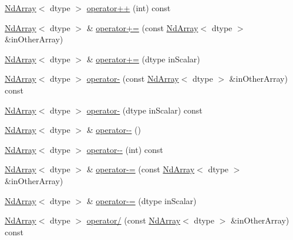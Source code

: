 \begin{DoxyCompactItemize}
\item 
\mbox{\hyperlink{class_num_cpp_1_1_nd_array}{Nd\+Array}}$<$ dtype $>$ \mbox{\hyperlink{class_num_cpp_1_1_nd_array_a3b71c8d4b1f8bf6403a270df980ae7c9}{operator++}} (int) const
\item 
\mbox{\hyperlink{class_num_cpp_1_1_nd_array}{Nd\+Array}}$<$ dtype $>$ \& \mbox{\hyperlink{class_num_cpp_1_1_nd_array_ade15ba24ad3bc5474c5f53681a6fd3fe}{operator+=}} (const \mbox{\hyperlink{class_num_cpp_1_1_nd_array}{Nd\+Array}}$<$ dtype $>$ \&in\+Other\+Array)
\item 
\mbox{\hyperlink{class_num_cpp_1_1_nd_array}{Nd\+Array}}$<$ dtype $>$ \& \mbox{\hyperlink{class_num_cpp_1_1_nd_array_a8a20ee8121408997c375ca1abb84273a}{operator+=}} (dtype in\+Scalar)
\item 
\mbox{\hyperlink{class_num_cpp_1_1_nd_array}{Nd\+Array}}$<$ dtype $>$ \mbox{\hyperlink{class_num_cpp_1_1_nd_array_abae124e6544458fec2b28685b59d7e3a}{operator-\/}} (const \mbox{\hyperlink{class_num_cpp_1_1_nd_array}{Nd\+Array}}$<$ dtype $>$ \&in\+Other\+Array) const
\item 
\mbox{\hyperlink{class_num_cpp_1_1_nd_array}{Nd\+Array}}$<$ dtype $>$ \mbox{\hyperlink{class_num_cpp_1_1_nd_array_a1b0d4f050529450d7232abd459168341}{operator-\/}} (dtype in\+Scalar) const
\item 
\mbox{\hyperlink{class_num_cpp_1_1_nd_array}{Nd\+Array}}$<$ dtype $>$ \& \mbox{\hyperlink{class_num_cpp_1_1_nd_array_a79070064dbee1bc428c0863b02be69b1}{operator-\/-\/}} ()
\item 
\mbox{\hyperlink{class_num_cpp_1_1_nd_array}{Nd\+Array}}$<$ dtype $>$ \mbox{\hyperlink{class_num_cpp_1_1_nd_array_afe9c56f2d5ff4d221d7842ef740b70e7}{operator-\/-\/}} (int) const
\item 
\mbox{\hyperlink{class_num_cpp_1_1_nd_array}{Nd\+Array}}$<$ dtype $>$ \& \mbox{\hyperlink{class_num_cpp_1_1_nd_array_aff0145b9754a80df6934caff08131e39}{operator-\/=}} (const \mbox{\hyperlink{class_num_cpp_1_1_nd_array}{Nd\+Array}}$<$ dtype $>$ \&in\+Other\+Array)
\item 
\mbox{\hyperlink{class_num_cpp_1_1_nd_array}{Nd\+Array}}$<$ dtype $>$ \& \mbox{\hyperlink{class_num_cpp_1_1_nd_array_a0623a6cffd97c49df7d34d5de335143b}{operator-\/=}} (dtype in\+Scalar)
\item 
\mbox{\hyperlink{class_num_cpp_1_1_nd_array}{Nd\+Array}}$<$ dtype $>$ \mbox{\hyperlink{class_num_cpp_1_1_nd_array_a7a33ca0868d55faf89c20afd3b1db026}{operator/}} (const \mbox{\hyperlink{class_num_cpp_1_1_nd_array}{Nd\+Array}}$<$ dtype $>$ \&in\+Other\+Array) const

\end{DoxyCompactItemize}
